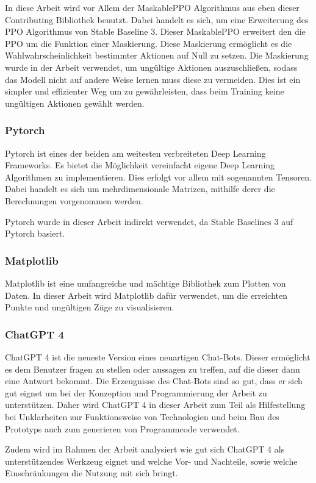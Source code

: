 In diese Arbeit wird vor Allem der MaskablePPO Algorithmus aus eben dieser Contributing Bibliothek benutzt. Dabei handelt es sich, um eine Erweiterung des PPO Algorithmus von Stable Baseline 3. Dieser MaskablePPO erweitert den die PPO um die Funktion einer Maskierung. Diese Maskierung ermöglicht es die Wahlwahrscheinlichkeit bestimmter Aktionen auf Null zu setzen. Die Maskierung wurde in der Arbeit verwendet, um ungültige Aktionen auszuschließen, sodass das Modell nicht auf andere Weise lernen muss diese zu vermeiden. Dies ist ein simpler und effizienter Weg um zu gewährleisten, dass beim Training keine ungültigen Aktionen gewählt werden.
\subsubsection{Pytorch}
Pytorch ist eines der beiden am weitesten verbreiteten Deep Learning Frameworks. Es bietet die Möglichkeit vereinfacht eigene Deep Learning Algorithmen zu implementieren. Dies erfolgt vor allem mit sogenannten Tensoren. Dabei handelt es sich um mehrdimensionale Matrizen, mithilfe derer die Berechnungen vorgenommen werden. 

Pytorch wurde in dieser Arbeit indirekt verwendet, da Stable Baselines 3 auf Pytorch basiert.
\subsubsection{Matplotlib}
Matplotlib ist eine umfangreiche und mächtige Bibliothek zum Plotten von Daten. In dieser Arbeit wird Matplotlib dafür verwendet, um die erreichten Punkte und ungültigen Züge zu visualisieren.
\subsubsection{ChatGPT 4}
ChatGPT 4 ist die neueste Version eines neuartigen Chat-Bots. Dieser ermöglicht es dem Benutzer fragen zu stellen oder aussagen zu treffen, auf die dieser dann eine Antwort bekommt. Die Erzeugnisse des Chat-Bots sind so gut, dass er sich gut eignet um bei der Konzeption und Programmierung der Arbeit zu unterstützen. Daher wird ChatGPT 4 in dieser Arbeit zum Teil als Hilfestellung bei Unklarheiten zur Funktionsweise von Technologien und beim Bau des Prototyps auch zum generieren von Programmcode verwendet. 

Zudem wird im Rahmen der Arbeit analysiert wie gut sich ChatGPT 4 als unterstützendes Werkzeug eignet und welche Vor- und Nachteile, sowie welche Einschränkungen die Nutzung mit sich bringt.